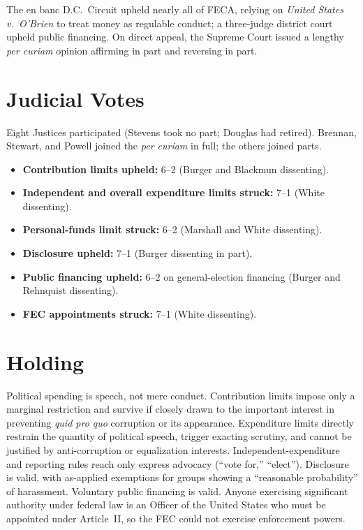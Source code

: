 \documentclass[12pt]{article}
\begin{document}
The en banc D.C.\ Circuit upheld nearly all of FECA, relying on \textit{United States v.\ O'Brien} to treat money as regulable conduct; a three-judge district court upheld public financing. On direct appeal, the Supreme Court issued a lengthy \textit{per curiam} opinion affirming in part and reversing in part.

\section{Judicial Votes}

Eight Justices participated (Stevens took no part; Douglas had retired). Brennan, Stewart, and Powell joined the \textit{per curiam} in full; the others joined parts.
\begin{itemize}
\item \textbf{Contribution limits upheld:} 6--2 (Burger and Blackmun dissenting).
\item \textbf{Independent and overall expenditure limits struck:} 7--1 (White dissenting).
\item \textbf{Personal-funds limit struck:} 6--2 (Marshall and White dissenting).
\item \textbf{Disclosure upheld:} 7--1 (Burger dissenting in part).
\item \textbf{Public financing upheld:} 6--2 on general-election financing (Burger and Rehnquist dissenting).
\item \textbf{FEC appointments struck:} 7--1 (White dissenting).
\end{itemize}

\section{Holding}

Political spending is speech, not mere conduct. Contribution limits impose only a marginal restriction and survive if closely drawn to the important interest in preventing \textit{quid pro quo} corruption or its appearance. Expenditure limits directly restrain the quantity of political speech, trigger exacting scrutiny, and cannot be justified by anti-corruption or equalization interests. Independent-expenditure and reporting rules reach only express advocacy (``vote for,'' ``elect''). Disclosure is valid, with as-applied exemptions for groups showing a ``reasonable probability'' of harassment. Voluntary public financing is valid. Anyone exercising significant authority under federal law is an Officer of the United States who must be appointed under Article~II, so the FEC could not exercise enforcement powers.
\end{document}

